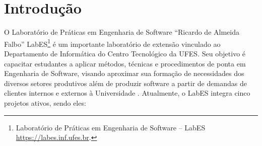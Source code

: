 \chapter{Introdução}
\label{sec-intro}
O Laboratório de Práticas em Engenharia de Software “Ricardo de Almeida Falbo” LabES\footnote{Laboratório de Práticas em Engenharia de Software – LabES \url{https://labes.inf.ufes.br}.}
 é um importante laboratório de extensão vinculado ao  Departamento de Informática do Centro Tecnológico da UFES. Seu objetivo é capacitar estudantes a aplicar métodos, técnicas e procedimentos de ponta em Engenharia de Software, visando aproximar sua formação de necessidades dos diversos setores produtivos além de produzir software a partir de demandas de clientes internos e externos à Universidade \cite{LabES}. Atualmente, o LabES integra cinco projetos ativos, sendo eles:
